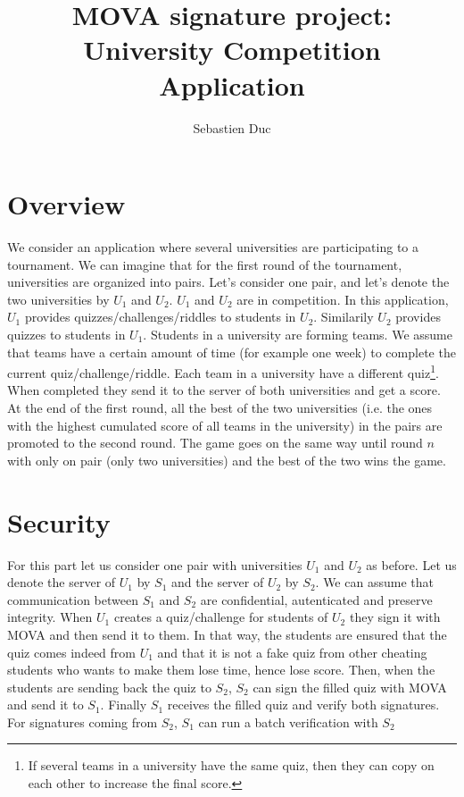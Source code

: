 \documentclass[12pt,a4paper]{article}
\title{MOVA signature project: University Competition Application}
\author{Sebastien Duc}
\date{}
\begin{document}
    \maketitle

    \section{Overview}
    We consider an application where several universities are participating to a tournament.
    We can imagine that for the first round of the tournament, universities are organized into
    pairs. Let's consider one pair, and let's denote the two universities by $U_1$ and $U_2$. $U_1$ and $U_2$  are in competition.
    In this application, $U_1$ provides quizzes/challenges/riddles to students in $U_2$. Similarily $U_2$ provides quizzes to students in $U_1$.
    Students in a university are forming teams. We assume that teams have a certain amount of time (for example one week) to complete the current quiz/challenge/riddle. 
    Each team in a university have a different quiz\footnote{If several teams in a university have the same quiz, then they can copy on each other to increase the final score.}.
    When completed they send it to the server of both universities and get a score. At the end of the first round, all the best of the two universities 
    (i.e. the ones with the highest cumulated score of all teams in the university) in the pairs are 
    promoted to the second round. The game goes on the same way until round $n$ with only on pair (only two universities) and the best of the two wins the game.

    \section{Security}
    For this part let us consider one pair with universities $U_1$ and $U_2$ as before. Let us denote the server of $U_1$ by $S_1$ and the server of $U_2$ by $S_2$.
    We can assume that communication between $S_1$ and $S_2$ are confidential, autenticated and preserve integrity.
    When $U_1$ creates a quiz/challenge for students of $U_2$ they sign it with MOVA and then send it to them. In that way, the students are ensured that the quiz comes indeed
    from $U_1$ and that it is not a fake quiz from other cheating students who wants to make them lose time, hence lose score.
    Then, when the students are sending back the quiz to $S_2$, $S_2$ can sign the filled quiz with MOVA and send it to $S_1$. Finally $S_1$ receives the filled quiz and verify both signatures.
    For signatures coming from $S_2$, $S_1$ can run a batch verification with $S_2$
\end{document}
